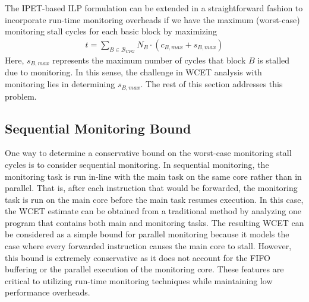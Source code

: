 The IPET-based ILP formulation can be 
extended in a straightforward fashion to incorporate run-time monitoring overheads
if we have the maximum (worst-case) 
monitoring stall cycles for each basic block by maximizing
\begin{align*}
  t = \sum_{B \in \mathcal{B}_{CFG}}{N_{B} \cdot (c_{B,max} + s_{B,max})}
\end{align*}
Here, $s_{B,max}$ represents the maximum number of cycles that block $B$ is stalled 
due to monitoring. In this sense, the challenge in WCET analysis with
monitoring lies in determining $s_{B,max}$. 
The rest of this section addresses this problem.

\subsection{Sequential Monitoring Bound}
\label{sec:formulation:sequential}

One way to determine a conservative bound on the worst-case monitoring stall cycles 
is to consider sequential monitoring.
In
sequential monitoring, the monitoring task is run in-line with the main task on the same core
rather than in parallel. That is, after each instruction that would be
forwarded, the monitoring task is run on the main core before the main task
resumes execution. In this case, the WCET estimate can be obtained from 
a traditional method by analyzing one program that contains both main and
monitoring tasks.
The resulting WCET can be considered as a simple bound
for parallel monitoring because it models the case where every forwarded 
instruction causes the main core to stall.
However, this bound is
extremely conservative as it does not account for the FIFO buffering or the
parallel execution of the monitoring core. These features are critical to
utilizing run-time monitoring techniques while maintaining low performance
overheads.


